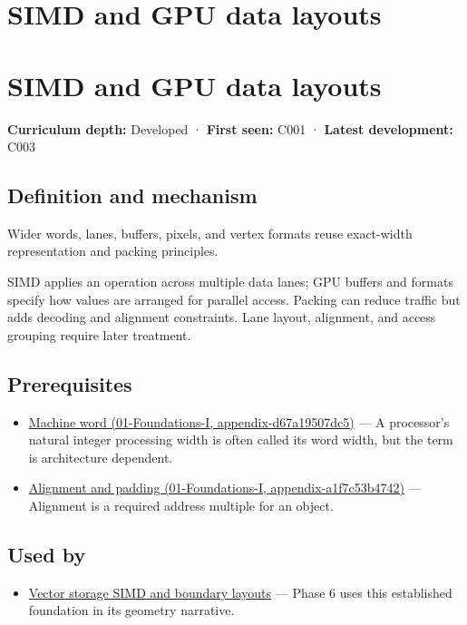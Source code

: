 \hypertarget{appendix-3c7b1a56de01}{}
\section*{SIMD and GPU data layouts}
\section{SIMD and GPU data layouts}\label{simd-and-gpu-data-layouts}

\textbf{Curriculum depth:} Developed · \textbf{First seen:} C001 · \textbf{Latest development:} C003

\subsection{Definition and mechanism}\label{definition-and-mechanism}

Wider words, lanes, buffers, pixels, and vertex formats reuse exact-width representation and packing principles.

SIMD applies an operation across multiple data lanes; GPU buffers and formats specify how values are arranged for parallel access. Packing can reduce traffic but adds decoding and alignment constraints. Lane layout, alignment, and access grouping require later treatment.

\subsection{Prerequisites}\label{prerequisites}

\begin{itemize}
\tightlist
\item
  \href{}{Machine word (01-Foundations-I, appendix-d67a19507dc5)} --- A processor's natural integer processing width is often called its word width, but the term is architecture dependent.
\item
  \href{}{Alignment and padding (01-Foundations-I, appendix-a1f7c53b4742)} --- Alignment is a required address multiple for an object.
\end{itemize}

\subsection{Used by}\label{used-by}

\begin{itemize}
\tightlist
\item
  \hyperref[appendix-26bf6bf2fb8b]{Vector storage SIMD and boundary layouts} --- Phase 6 uses this established foundation in its geometry narrative.
\end{itemize}

